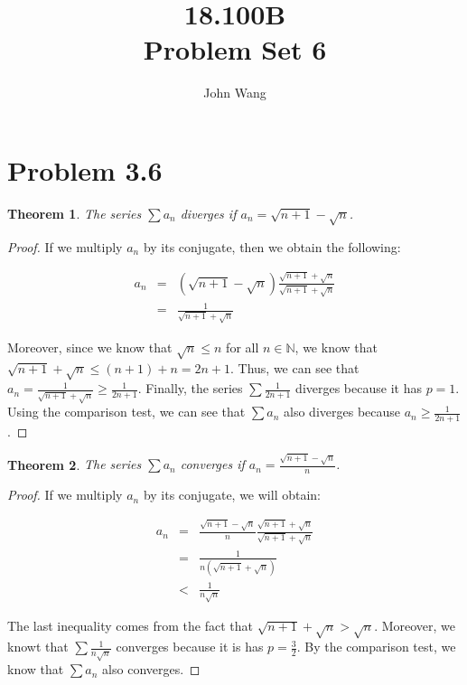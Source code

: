 \documentclass[psamsfonts]{amsart}
\title{18.100B \\
Problem Set 6}
\author{John Wang}
\newtheorem{thm}{Theorem}[section]
\theoremstyle{definition}
\theoremstyle{remark}
\numberwithin{equation}{section}
\begin{document}
\maketitle

\section{Problem 3.6}

\begin{thm}
The series $\sum a_n $ diverges if $a_n = \sqrt{n+1} - \sqrt{n}$. 
\end{thm}

\begin{proof}
If we multiply $a_n$ by its conjugate, then we obtain the following:

\begin{eqnarray}
a_n &=& (\sqrt{n+1} - \sqrt{n}) \frac{\sqrt{n+1} + \sqrt{n}}{\sqrt{n+1} + \sqrt{n}} \\
&=& \frac{1}{\sqrt{n+1} + \sqrt{n}}
\end{eqnarray}

Moreover, since we know that $\sqrt{n} \leq n$ for all $n \in \mathbb{N}$, we know that $\sqrt{n+1} + \sqrt{n} \leq (n + 1) + n = 2n + 1$. Thus, we can see that $a_n = \frac{1}{\sqrt{n+1}+\sqrt{n}} \geq \frac{1}{2n+1}$. Finally, the series $\sum \frac{1}{2n+1}$ diverges because it has $p = 1$. Using the comparison test, we can see that $\sum a_n$ also diverges because $a_n \geq \frac{1}{2n+1}$. 
\end{proof}

\begin{thm}
The series $\sum a_n$ converges if $a_n = \frac{\sqrt{n+1} - \sqrt{n}}{n}$.
\end{thm}

\begin{proof}
If we multiply $a_n$ by its conjugate, we will obtain:

\begin{eqnarray}
a_n &=& \frac{\sqrt{n+1} - \sqrt{n}}{n} \frac{\sqrt{n+1} + \sqrt{n}}{\sqrt{n+1}+\sqrt{n}} \\
&=& \frac{1}{ n (\sqrt{n+1} + \sqrt{n})} \\
&<& \frac{1}{ n \sqrt{n}} 
\end{eqnarray}

The last inequality comes from the fact that $\sqrt{n+1} + \sqrt{n} > \sqrt{n}$. Moreover, we knowt that $\sum \frac{1}{n \sqrt{n}}$ converges because it is has $p = \frac{3}{2}$. By the comparison test, we know that $\sum a_n$ also converges.
\end{proof}
\end{document}
